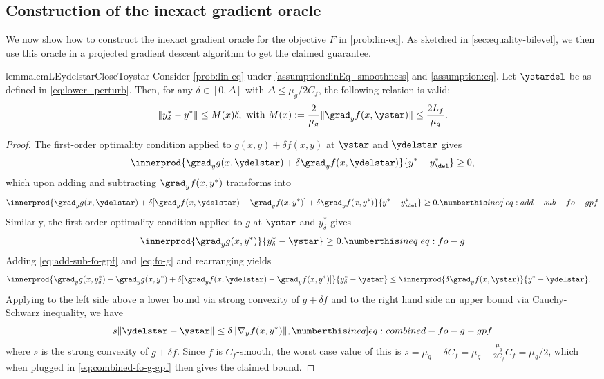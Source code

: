 \subsection{Construction of the inexact gradient oracle}
We now show how to construct the inexact gradient oracle for the objective $F$ in \cref{prob:lin-eq}. As sketched in \cref{sec:equality-bilevel}, we then use this oracle in a projected gradient descent algorithm to get the claimed guarantee. 
\begin{restatable}{lemma}{lemLEydelstarCloseToystar}
\label{lem:y-delstar-Lip} Consider  \cref{prob:lin-eq} under \cref{assumption:linEq_smoothness} and \cref{assumption:eq}.
Let  $\ystardel$ be as defined in \cref{eq:lower_perturb}. 
Then, for any $\delta\in[0,\Delta]$ with $\Delta\leq\mu_{g}/2C_{f}$, the following
relation is valid: \[
\|y_{\delta}^{*}-y^{*}\|\leq M(x)\delta,   \textrm{ with } M(x):=\frac{2}{\mu_{g}}\|\grad_{y} f(x,\ystar)\|\leq \frac{2L_f}{\mu_g}.
\]
\end{restatable}
\begin{proof}
    The first-order optimality condition applied to $g(x,y)+\delta f(x,y)$ at $\ystar$ and $\ydelstar$ gives 
\[ \innerprod{\grad_y g(x,\ydelstar)+\delta\grad_y f(x,\ydelstar)}{y^{*}-y_{\del}^{*}} \geq0,\] which upon adding and subtracting $\grad_y f(x,y^{*})$ transforms into
\[ \innerprod{\grad_y g(x,\ydelstar)+\delta[\grad_y f(x,\ydelstar)-\grad_y f(x,y^{*})]+\delta\grad_y f(x,y^{*})}{y^{*}-y_{\del}^{*}}\geq0.\numberthis\label[ineq]{eq:add-sub-fo-gpf}\] Similarly, the first-order optimality condition applied to $g$ at $\ystar$ and $y_{\delta}^{*}$ gives 
\[\innerprod{\grad_y g(x,y^{*})}{y_{\delta}^{*}-\ystar} \geq0.\numberthis\label[ineq]{eq:fo-g}\]
Adding \cref{eq:add-sub-fo-gpf} and \cref{eq:fo-g} and rearranging yields 
\begin{align*}
\innerprod{\grad_y g(x,y_{\delta}^{*})-\grad_y g(x,y^{*})+\delta[\grad_y f(x,\ydelstar)-\grad_y f(x,y^{*})]}{y_{\delta}^{*}-\ystar} & \leq\innerprod{\delta\grad_y f(x,\ystar)}{y^{*}-\ydelstar}.
\end{align*} Applying to the left side above a lower bound via strong convexity of $g+\delta f$ and to the right hand side an upper bound via Cauchy-Schwarz inequality, we have
\[s\|\ydelstar-\ystar\|\leq \delta \|\nabla_y f(x, y^*)\|, \numberthis\label[ineq]{eq:combined-fo-g-gpf}\] where $s$ is the strong convexity of $g+\delta f$. Since $f$ is $C_f$-smooth, the worst case
value of this is $s=\mu_{g}-\delta C_{f}=\mu_{g}-\frac{\mu_{g}}{2C_{f}}C_{f}=\mu_{g}/2$, which when plugged in \cref{eq:combined-fo-g-gpf} then gives the claimed bound. 
\end{proof}





